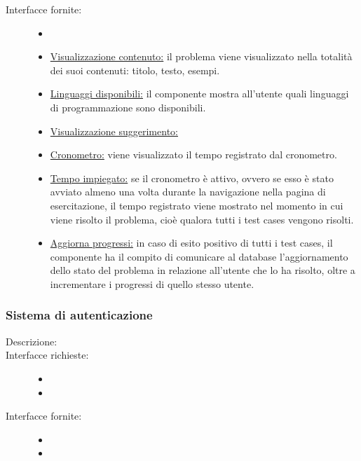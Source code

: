 \documentclass[11pt, a4paper]{article}
\theoremstyle{definition} %
\begin{document}
\begin{description}
    \item[Interfacce fornite:]
    \begin{itemize}
        \item[]

        \item \underline{Visualizzazione contenuto:} il problema viene visualizzato nella
        totalità dei suoi contenuti: titolo, testo, esempi.

        \item \underline{Linguaggi disponibili:} il componente mostra all'utente quali
        linguaggi di programmazione sono disponibili.

        \item \underline{Visualizzazione suggerimento:}

        \item \underline{Cronometro:} viene visualizzato il tempo registrato dal
        cronometro.

        \item \underline{Tempo impiegato:} se il cronometro è attivo, ovvero se esso è
        stato avviato almeno una volta durante la navigazione nella pagina di esercitazione,
        il tempo registrato viene mostrato nel momento in cui viene risolto il problema,
        cioè qualora tutti i test cases vengono risolti.

        \item \underline{Aggiorna progressi:} in caso di esito positivo di tutti i
        test cases, il componente ha il compito di comunicare al database l'aggiornamento
        dello stato del problema in relazione all'utente che lo ha risolto, oltre a
        incrementare i progressi di quello stesso utente.
    \end{itemize}
\end{description}

\subsubsection{Sistema di autenticazione}
\begin{description}
    \item[Descrizione:]

    \item[Interfacce richieste:]
    \begin{itemize}
        \item[]

        \item
    \end{itemize}

    \item[Interfacce fornite:]
    \begin{itemize}
        \item[]

        \item
    \end{itemize}
\end{description}
\end{document}
